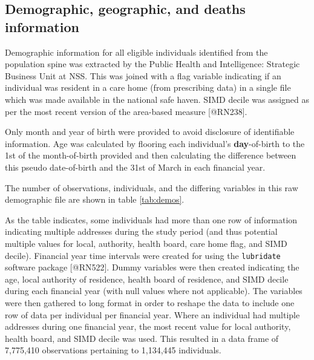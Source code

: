 \documentclass[]{article}
\begin{document}
\FloatBarrier

\subsection{Demographic, geographic, and deaths information}\label{subsubsec:nrs-summs}

Demographic information for all eligible individuals identified from the
population spine was extracted by the Public Health and Intelligence:
Strategic Business Unit at NSS. This was joined with a flag variable
indicating if an individual was resident in a care home (from
prescribing data) in a single file which was made available in the
national safe haven. SIMD decile was assigned as per the most recent
version of the area-based measure {[}@RN238{]}.

Only month and year of birth were provided to avoid disclosure of
identifiable information. Age was calculated by flooring each
individual's \textbf{day}-of-birth to the 1st of the month-of-birth
provided and then calculating the difference between this pseudo
date-of-birth and the 31st of March in each financial year.

The number of observations, individuals, and the differing variables in
this raw demographic file are shown in table \ref{tab:demos}.

\begin{table}[h]
\centering
\caption{Demographic file data}
\label{tab:demos}
\end{table}

As the table indicates, some individuals had more than one row of
information indicating multiple addresses during the study period (and
thus potential multiple values for local, authority, health board, care
home flag, and SIMD decile). Financial year time intervals were created
for using the \texttt{lubridate} software package {[}@RN522{]}. Dummy
variables were then created indicating the age, local authority of
residence, health board of residence, and SIMD decile during each
financial year (with null values where not applicable). The variables
were then gathered to long format in order to reshape the data to
include one row of data per individual per financial year. Where an
individual had multiple addresses during one financial year, the most
recent value for local authority, health board, and SIMD decile was
used. This resulted in a data frame of 7,775,410 observations pertaining
to 1,134,445 individuals.
\end{document}
